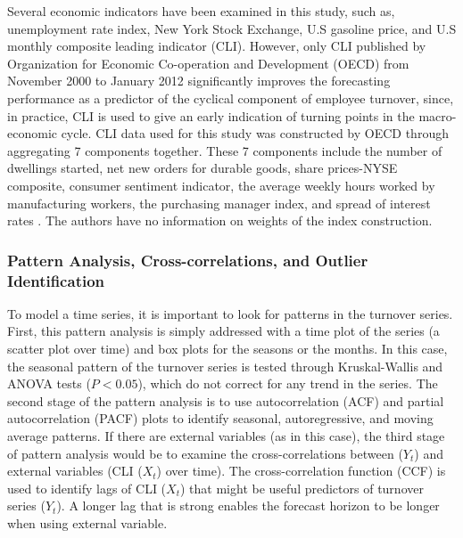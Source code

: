 Several economic indicators have been examined in this study, such as, unemployment rate index, New York Stock Exchange, U.S gasoline price, and U.S monthly composite leading indicator (CLI). However, only CLI published by Organization for Economic Co-operation and Development (OECD) from November 2000 to January 2012 significantly improves the forecasting performance as a predictor of the cyclical component of employee turnover, since, in practice, CLI is used to give an early indication of turning points in the macro-economic cycle. CLI data used for this study was constructed by OECD through aggregating 7 components together. These 7 components include the number of dwellings started, net new orders for durable goods, share prices-NYSE composite, consumer sentiment indicator, the average weekly hours worked by manufacturing workers, the purchasing manager index, and spread of interest rates  \citep{oecd2013}. The authors have no information on weights of the index construction.
\subsubsection{Pattern Analysis, Cross-correlations, and Outlier Identification}
To model a time series, it is important to look for patterns in the turnover series.  First, this pattern analysis is simply addressed with a time plot of the series (a scatter plot over time) and box plots for the seasons or the months. In this case, the seasonal pattern of the turnover series is tested through Kruskal-Wallis and ANOVA tests ($P<0.05$), which do not correct for any trend in the series. The second stage of the pattern analysis is to use autocorrelation (ACF) and partial autocorrelation (PACF) plots to identify seasonal, autoregressive, and moving average patterns. If there are external variables (as in this case), the third stage of pattern analysis would be to examine the cross-correlations between ($Y_t$) and external variables (CLI ($X_t$) over time). The cross-correlation function (CCF) is used to identify lags of CLI ($X_t$) that might be useful predictors of turnover series ($Y_t$).  A longer lag that is strong enables the forecast horizon to be longer when using external variable. 


